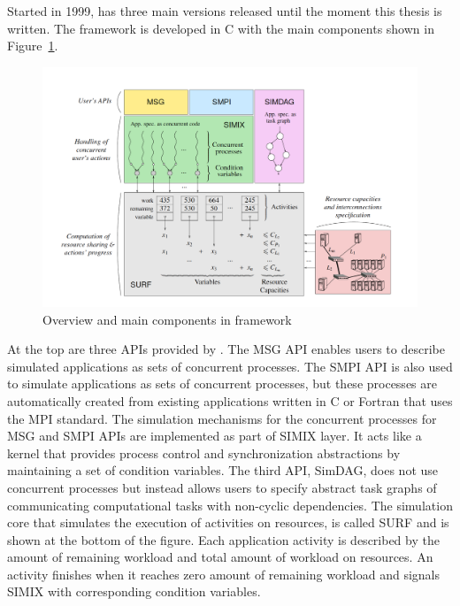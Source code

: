 Started in 1999, \simgrid has three main versions released until the moment 
this thesis is written. 
The \simgrid framework is developed in C with the main components shown in 
Figure~\ref{fig:simgrid}.

\begin{figure}[!h]
     \centering
     \includegraphics[width=\linewidth]{figures/simgrid.png}
     \caption{Overview and main components in \simgrid framework}
     \label{fig:simgrid}
\end{figure}

At the top are three APIs provided by \simgrid. 
The MSG API enables users to describe simulated applications as sets of 
concurrent processes. 
The SMPI API is also used to simulate applications as sets of 
concurrent processes, but these processes are automatically created from 
existing applications written in C or Fortran that uses the MPI standard.
The simulation mechanisms for the concurrent processes for MSG and SMPI APIs
are implemented as part of SIMIX layer. It acts like a kernel that provides 
process control and synchronization abstractions by maintaining a set of 
condition variables.
The third API, SimDAG, does not use concurrent processes but instead 
allows users to specify abstract task graphs of communicating computational 
tasks with non-cyclic dependencies.
The simulation core that simulates the execution of activities on resources, 
is called SURF and is shown at the bottom of the figure.
Each application activity is described by the amount of remaining workload 
and total amount of workload on resources.
An activity finishes when it reaches zero amount of remaining workload and 
signals SIMIX with corresponding condition variables. 
 
